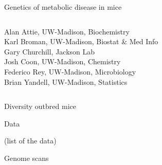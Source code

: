 \documentclass[aspectratio=169,12pt,t]{beamer}
\begin{document}
\begin{frame}[c]{Genetics of metabolic disease in mice}

  \begin{columns}
    \begin{column}{0.50\textwidth}

\vspace*{12pt}

      \footnotesize
\hspace*{-3mm}
    Alan Attie, UW-Madison, Biochemistry \\[12pt]
\hspace*{-3mm}
    Karl Broman, UW-Madison, Biostat \& Med Info \\[12pt]
\hspace*{-3mm}
    Gary Churchill, Jackson Lab\\[12pt]
\hspace*{-3mm}
    Josh Coon, UW-Madison, Chemistry \\[12pt]
\hspace*{-3mm}
    Federico Rey, UW-Madison, Microbiology \\[12pt]
\hspace*{-3mm}
    Brian Yandell, UW-Madison, Statistics

    \end{column}

    \begin{column}{0.45\textwidth}


    \end{column}
  \end{columns}


\end{frame}




\begin{frame}[c]{Diversity outbred mice}

\vspace*{3mm}

\end{frame}



\begin{frame}[c]{Data}


(list of the data)


\end{frame}


\begin{frame}[c]{Genome scans}




\end{frame}
\end{document}
